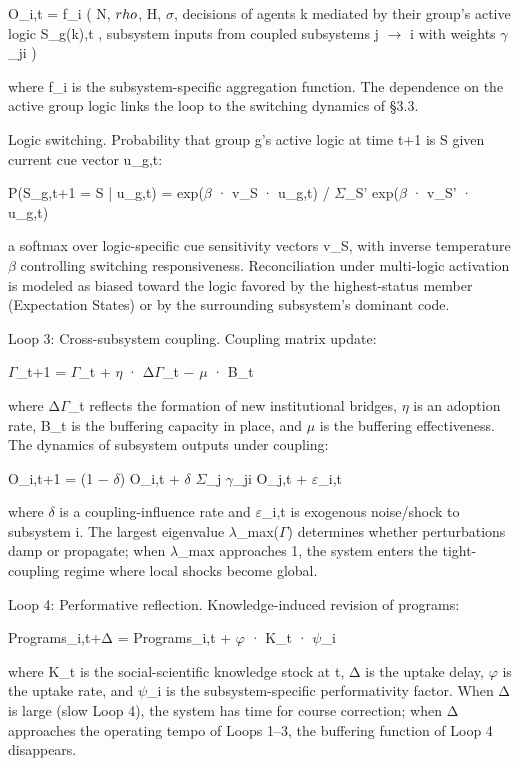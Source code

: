 \documentclass[12pt,a4paper]{article}
\begin{document}
O_{i,t} = f_i ( N, $\\rho$, H, $\sigma$, {decisions of agents k mediated by their group's active logic S_{g(k),t} }, {subsystem inputs from coupled subsystems j $\rightarrow$ i with weights $\gamma$_{ji}} )


where f_i is the subsystem-specific aggregation function. The dependence on the active group logic links the loop to the switching dynamics of §3.3.


Logic switching. Probability that group g's active logic at time t+1 is S given current cue vector u_{g,t}:


P(S_{g,t+1} = S | u_{g,t}) = exp($\beta$ · v_S · u_{g,t}) / $\Sigma$_{S'} exp($\beta$ · v_{S'} · u_{g,t})


a softmax over logic-specific cue sensitivity vectors v_S, with inverse temperature $\beta$ controlling switching responsiveness. Reconciliation under multi-logic activation is modeled as biased toward the logic favored by the highest-status member (Expectation States) or by the surrounding subsystem's dominant code.


Loop 3: Cross-subsystem coupling. Coupling matrix update:


$\Gamma$_{t+1} = $\Gamma$_t + $\eta$ · Δ$\Gamma$_t − $\mu$ · B_t


where Δ$\Gamma$_t reflects the formation of new institutional bridges, $\eta$ is an adoption rate, B_t is the buffering capacity in place, and $\mu$ is the buffering effectiveness. The dynamics of subsystem outputs under coupling:


O_{i,t+1} = (1 − $\delta$) O_{i,t} + $\delta$ $\Sigma$_j $\gamma$_{ji} O_{j,t} + $\varepsilon$_{i,t}


where $\delta$ is a coupling-influence rate and $\varepsilon$_{i,t} is exogenous noise/shock to subsystem i. The largest eigenvalue $\lambda$_max($\Gamma$) determines whether perturbations damp or propagate; when $\lambda$_max approaches 1, the system enters the tight-coupling regime where local shocks become global.


Loop 4: Performative reflection. Knowledge-induced revision of programs:


Programs_{i,t+Δ} = Programs_{i,t} + $\varphi$ · K_t · $\psi$_i


where K_t is the social-scientific knowledge stock at t, Δ is the uptake delay, $\varphi$ is the uptake rate, and $\psi$_i is the subsystem-specific performativity factor. When Δ is large (slow Loop 4), the system has time for course correction; when Δ approaches the operating tempo of Loops 1--3, the buffering function of Loop 4 disappears.
\end{document}
